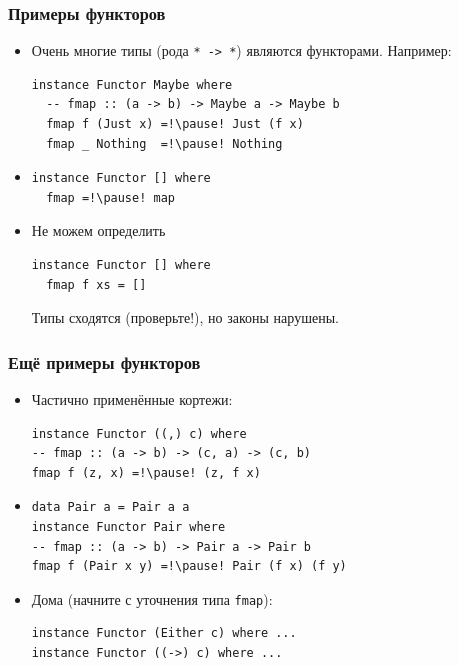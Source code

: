 \documentclass[11pt]{beamer}
\begin{document}
\begin{frame}[fragile]
\frametitle{Примеры функторов}
\begin{itemize}
    \item Очень многие типы (рода \lstinline|* -> *|) являются функторами. Например:
\begin{lstlisting}
instance Functor Maybe where 
  -- fmap :: (a -> b) -> Maybe a -> Maybe b
  fmap f (Just x) =!\pause! Just (f x)
  fmap _ Nothing  =!\pause! Nothing
\end{lstlisting}
    \pause
    \item 
\begin{lstlisting}
instance Functor [] where 
  fmap =!\pause! map
\end{lstlisting}
    \item Не можем определить
\begin{lstlisting}
instance Functor [] where 
  fmap f xs = []
\end{lstlisting}
\pause
Типы сходятся (проверьте!), но законы нарушены.
\end{itemize}
\end{frame}

\begin{frame}[fragile]
\frametitle{Ещё примеры функторов}
\begin{itemize}
    \item Частично применённые кортежи:
\begin{lstlisting}
instance Functor ((,) c) where 
-- fmap :: (a -> b) -> (c, a) -> (c, b)
fmap f (z, x) =!\pause! (z, f x)
\end{lstlisting}
    \pause
    \item
\begin{lstlisting}
data Pair a = Pair a a
instance Functor Pair where 
-- fmap :: (a -> b) -> Pair a -> Pair b
fmap f (Pair x y) =!\pause! Pair (f x) (f y)
\end{lstlisting}
    \pause
    \item Дома (начните с уточнения типа \lstinline|fmap|):
\begin{lstlisting}
instance Functor (Either c) where ...
instance Functor ((->) c) where ...
\end{lstlisting}
\end{itemize}
\end{frame}
\end{document}
